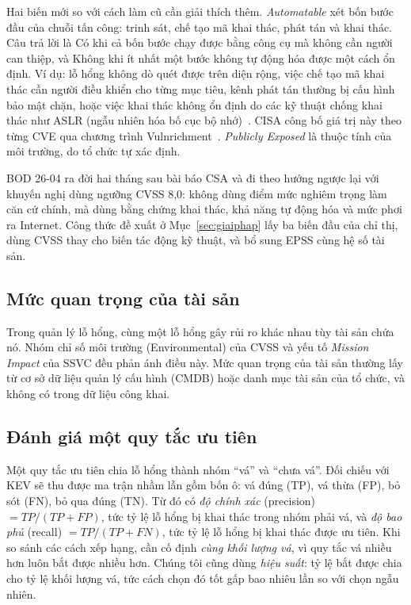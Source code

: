 \documentclass[runningheads]{llncs}
\begin{document}
Hai biến mới so với cách làm cũ cần giải thích thêm. \emph{Automatable} xét bốn bước đầu của chuỗi tấn công:
trinh sát, chế tạo mã khai thác, phát tán và khai thác. Câu trả lời là Có khi cả bốn bước chạy được bằng công cụ
mà không cần người can thiệp, và Không khi ít nhất một bước không tự động hóa được một cách ổn định. Ví dụ: lỗ hổng không dò quét được trên diện rộng, việc chế tạo mã khai thác cần người điều khiển cho từng mục tiêu, kênh phát tán thường bị cấu hình bảo mật chặn, hoặc việc khai thác không ổn định do các kỹ thuật chống khai thác như ASLR (ngẫu nhiên hóa bố cục bộ nhớ)~\cite{ssvcauto}. CISA công bố giá trị này theo từng CVE qua chương trình
Vulnrichment~\cite{vulnrichment}. \emph{Publicly Exposed} là thuộc tính của môi trường, do tổ chức tự xác định.

BOD 26-04 ra đời hai tháng sau bài báo CSA và đi theo hướng ngược lại với khuyến nghị dùng ngưỡng CVSS 8,0:
không dùng điểm mức nghiêm trọng làm căn cứ chính, mà dùng bằng chứng khai thác, khả năng tự động hóa và mức
phơi ra Internet. Công thức đề xuất ở Mục~\ref{sec:giaiphap} lấy ba biến đầu của chỉ thị, dùng CVSS thay cho
biến tác động kỹ thuật, và bổ sung EPSS cùng hệ số tài sản.

\subsection{Mức quan trọng của tài sản}
Trong quản lý lỗ hổng, cùng một lỗ hổng gây rủi ro khác nhau tùy tài sản chứa nó. Nhóm chỉ
số môi trường (Environmental) của CVSS và yếu tố \emph{Mission Impact} của SSVC đều phản ánh
điều này. Mức quan trọng của tài sản thường lấy từ cơ sở dữ liệu quản lý cấu hình (CMDB) hoặc
danh mục tài sản của tổ chức, và không có trong dữ liệu công khai.

\subsection{Đánh giá một quy tắc ưu tiên}
Một quy tắc ưu tiên chia lỗ hổng thành nhóm ``vá'' và ``chưa vá''. Đối chiếu với KEV sẽ thu được
ma trận nhầm lẫn gồm bốn ô: vá đúng (TP), vá thừa (FP), bỏ sót (FN), bỏ qua đúng (TN). Từ
đó có \emph{độ chính xác} (precision) $= TP/(TP+FP)$, tức tỷ lệ lỗ hổng bị khai thác trong
nhóm phải vá, và \emph{độ bao phủ} (recall) $= TP/(TP+FN)$, tức tỷ lệ lỗ hổng bị khai thác
được ưu tiên. Khi so sánh các cách xếp hạng, cần cố định \emph{cùng khối lượng vá}, vì quy
tắc vá nhiều hơn luôn bắt được nhiều hơn. Chúng tôi cũng dùng \emph{hiệu suất}: tỷ lệ bắt được
chia cho tỷ lệ khối lượng vá, tức cách chọn đó tốt gấp bao nhiêu lần so với chọn ngẫu nhiên.
\end{document}
